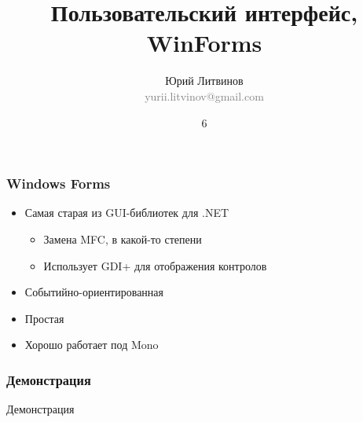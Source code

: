 \documentclass[xetex,mathserif,serif]{beamer}
\title{Пользовательский интерфейс, WinForms}
\author[Юрий Литвинов]{Юрий Литвинов\\\small{\textcolor{gray}{yurii.litvinov@gmail.com}}}
\date{6}
\begin{document}
	\frame{\titlepage}

	\begin{frame}
		\frametitle{Windows Forms}
		\begin{itemize}
			\item Самая старая из GUI-библиотек для .NET
			\begin{itemize}
				\item Замена MFC, в какой-то степени
				\item Использует GDI+ для отображения контролов
			\end{itemize}
			\item Событийно-ориентированная
			\item Простая
			\item Хорошо работает под Mono
		\end{itemize}
	\end{frame}

	\begin{frame}
		\frametitle{Демонстрация}
		\begin{Huge}\begin{center}Демонстрация\end{center}\end{Huge}
	\end{frame}
\end{document}

